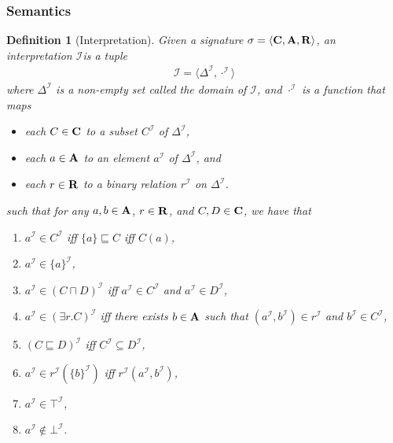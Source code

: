\documentclass[12pt]{article}
\newtheorem{definition}[theorem]{Definition}
\newcommand{\concepts}{{\bf C}}
\newcommand{\individuals}{{\bf A}}
\newcommand{\roles}{{\bf R}}
\newcommand{\tuple}[1]{\langle #1 \rangle}
\newcommand{\interpetationt}{$\mathcal{I}$}
\begin{document}
\subsubsection{Semantics}
\begin{definition}[Interpretation]
    Given a signature $\sigma=\tuple{\concepts, \individuals, \roles}$,
    an interpretation \interpetationt is a tuple
    \begin{align*}
        \mathcal{I} = \tuple{\Delta^\mathcal{I}, \cdot^\mathcal{I}}
    \end{align*}
    where $\Delta^\mathcal{I}$ is a non-empty set called the domain of
    $\mathcal{I}$, and $\cdot^\mathcal{I}$ is a function that maps
    \begin{itemize}
        \item each $C \in \concepts$ to a subset $C^\mathcal{I}$ of
            $\Delta^\mathcal{I}$,
        \item each $a \in \individuals$ to an element $a^\mathcal{I}$ of
            $\Delta^\mathcal{I}$, and
        \item each $r \in \roles$ to a binary relation $r^\mathcal{I}$ on
            $\Delta^\mathcal{I}$.
    \end{itemize}
    such that for any $a,b\in\individuals$, $r\in\roles$, and $C,D\in\concepts$,
    we have that
    \begin{enumerate}
        \item $a^\mathcal{I} \in C^\mathcal{I}$ iff $\{a\} \sqsubseteq C$ iff $C(a)$,
        \item $a^\mathcal{I} \in \{a\}^\mathcal{I}$,
        \item $a^\mathcal{I} \in (C\sqcap D)^\mathcal{I}$ iff
            $a^\mathcal{I} \in C^\mathcal{I}$ and $a^\mathcal{I} \in D^\mathcal{I}$,
        \item $a^\mathcal{I} \in (\exists r.C)^\mathcal{I}$ iff
            there exists $b\in\individuals$ such that $(a^\mathcal{I}, b^\mathcal{I})\in r^\mathcal{I}$
            and $b^\mathcal{I} \in C^\mathcal{I}$,
        \item $(C\sqsubseteq D)^\mathcal{I}$ iff
            $C^\mathcal{I} \subseteq D^\mathcal{I}$,
        \item $a^\mathcal{I} \in r^\mathcal{I}(\{b\}^\mathcal{I})$ iff
            $r^\mathcal{I}(a^\mathcal{I},b^\mathcal{I})$,
        \item $a^\mathcal{I} \in \top^\mathcal{I}$,
        \item $a^\mathcal{I} \notin \bot^\mathcal{I}$.
    \end{enumerate}
\end{definition}
\end{document}
